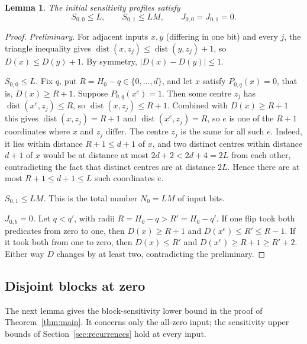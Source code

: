 \documentclass[11pt]{article}
\newtheorem{lemma}[theorem]{Lemma}
\theoremstyle{definition}
\theoremstyle{remark}
\begin{document}
\begin{lemma}\label{lem:base}
The initial sensitivity profiles satisfy
\begin{equation}\label{eq:base-profile}
 S_{0,0}\le L,\qquad S_{0,1}\le LM,\qquad
 J_{0,0}=J_{0,1}=0.
\end{equation}
\end{lemma}
\begin{proof}
\emph{Preliminary.} For adjacent inputs \(x,y\) (differing in one bit) and
every \(j\), the triangle inequality gives
\(\operatorname{dist}(x,z_j)\le\operatorname{dist}(y,z_j)+1\), so
\(D(x)\le D(y)+1\). By symmetry, \(|D(x)-D(y)|\le1\).

\emph{\(S_{0,0}\le L\).} Fix \(q\), put \(R=H_0-q\in\{0,\ldots,d\}\), and let
\(x\) satisfy \(P_{0,q}(x)=0\), that is, \(D(x)\ge R+1\). Suppose
\(P_{0,q}(x^e)=1\). Then some centre \(z_j\) has
\(\operatorname{dist}(x^e,z_j)\le R\), so
\(\operatorname{dist}(x,z_j)\le R+1\). Combined with \(D(x)\ge R+1\) this gives
\(\operatorname{dist}(x,z_j)=R+1\) and \(\operatorname{dist}(x^e,z_j)=R\), so
\(e\) is one of the \(R+1\) coordinates where \(x\) and \(z_j\) differ.
The centre \(z_j\) is the same for all such \(e\). Indeed, it lies within distance
\(R+1\le d+1\) of \(x\), and two distinct centres within distance \(d+1\) of
\(x\) would be at distance at most \(2d+2<2d+4=2L\) from each other,
contradicting the fact that distinct centres are at distance \(2L\). Hence
there are at most \(R+1\le d+1\le L\) such coordinates \(e\).

\emph{\(S_{0,1}\le LM\).} This is the total number \(N_0=LM\) of input bits.

\emph{\(J_{0,b}=0\).} Let \(q<q'\), with radii \(R=H_0-q>R'=H_0-q'\).
If one flip took both predicates from zero to one, then \(D(x)\ge R+1\) and
\(D(x^e)\le R'\le R-1\). If it took both from one to zero, then
\(D(x)\le R'\) and \(D(x^e)\ge R+1\ge R'+2\). Either way \(D\) changes by at
least two, contradicting the preliminary.
\end{proof}

\subsection{Disjoint blocks at zero}
The next lemma gives the block-sensitivity lower bound in the proof of
Theorem~\ref{thm:main}. It concerns only the all-zero input; the sensitivity
upper bounds of Section~\ref{sec:recurrences} hold at every input.
\end{document}
